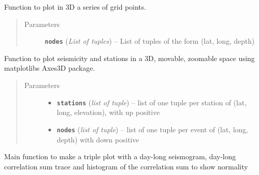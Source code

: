 \documentclass[a4paper,10pt,english]{sphinxmanual}
\begin{document}

\begin{fulllineitems}
\label{utils:EQcorrscan_plotting.threeD_gridplot}
Function to plot in 3D a series of grid points.
\begin{quote}\begin{description}
\item[{Parameters}] \leavevmode
\textbf{\texttt{nodes}} (\emph{List of tuples}) -- List of tuples of the form (lat, long, depth)

\end{description}\end{quote}

\end{fulllineitems}


\begin{fulllineitems}
\label{utils:EQcorrscan_plotting.threeD_seismplot}
Function to plot seismicity and stations in a 3D, movable, zoomable space
using matplotlibs Axes3D package.
\begin{quote}\begin{description}
\item[{Parameters}] \leavevmode\begin{itemize}
\item {} 
\textbf{\texttt{stations}} (\emph{list of tuple}) -- list of one tuple per station of (lat, long, elevation),
with up positive

\item {} 
\textbf{\texttt{nodes}} (\emph{list of tuple}) -- list of one tuple per event of (lat, long, depth) with down
positive

\end{itemize}

\end{description}\end{quote}

\end{fulllineitems}


\begin{fulllineitems}
\label{utils:EQcorrscan_plotting.triple_plot}
Main function to make a triple plot with a day-long seismogram, day-long
correlation sum trace and histogram of the correlation sum to show normality
\begin{quote}\begin{description}
\end{description}\end{quote}

\end{fulllineitems}
\end{document}
